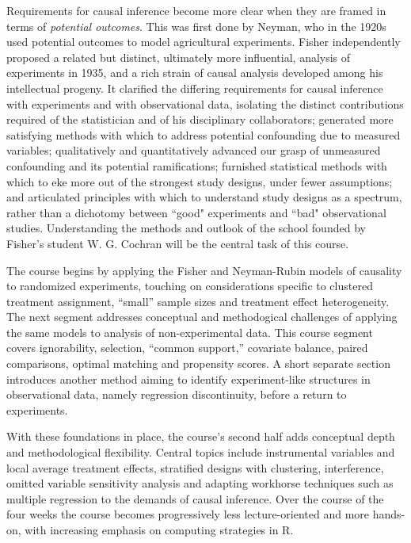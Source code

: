 \documentclass[12pt]{article}
\begin{document}
Requirements for causal inference become more clear when they are
framed in terms of \emph{potential outcomes}.  This was first done by
Neyman, who in the 1920s used potential outcomes to model agricultural
experiments.  Fisher independently proposed a related but distinct,
ultimately more influential, analysis of experiments in 1935, and a
rich strain of causal analysis developed among his intellectual
progeny.  It clarified the differing requirements for causal inference
with experiments and with observational data, isolating the distinct
contributions required of the statistician and of his disciplinary
collaborators; generated more satisfying methods with which to address
potential confounding due to measured variables; qualitatively and
quantitatively advanced our grasp of unmeasured confounding and its
potential ramifications; furnished statistical methods with which to
eke more out of the strongest study designs, under fewer assumptions;
and articulated principles with which to understand study designs as a
spectrum, rather than a dichotomy between ``good" experiments and
``bad" observational studies. Understanding the methods and outlook of
the school founded by Fisher's student W. G. Cochran will be the
central task of this course.

The course begins by applying the Fisher and Neyman-Rubin models of
causality to randomized experiments, touching on considerations
specific to clustered treatment assignment, ``small'' sample sizes and
treatment effect heterogeneity.  The next segment addresses conceptual
and methodogical challenges of applying the same models to analysis of
non-experimental data. This course segment covers ignorability,
selection, ``common support,'' covariate balance, paired comparisons,
optimal matching and propensity scores. A short separate section
introduces another method aiming to identify experiment-like
structures in observational data, namely regression discontinuity,
before a return to experiments.

With these foundations in place, the course's second half adds
conceptual depth and methodological flexibility.
Central topics include instrumental variables and local average
treatment effects, stratified designs with clustering, interference,
omitted variable sensitivity analysis and adapting workhorse
techniques such as multiple regression to the demands of causal
inference.  Over the course of the four weeks the course becomes
progressively less lecture-oriented and more hands-on, with increasing
emphasis on computing strategies in R.
\end{document}
